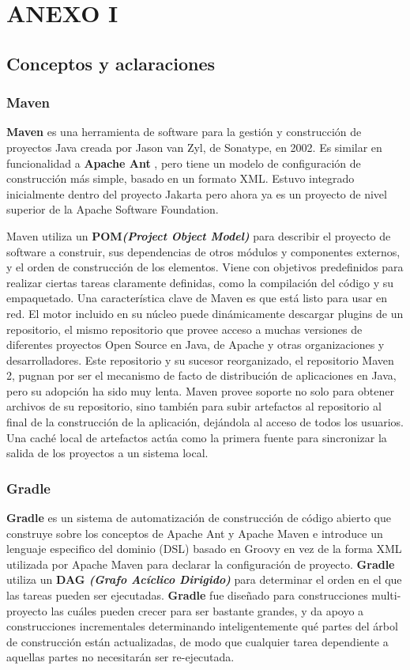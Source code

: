 \chapter{ANEXO I}
\section{Conceptos y aclaraciones}

\subsection{Maven}
\label{glo:maven}
\textbf{Maven} es una herramienta de software para la gestión y construcción de proyectos Java creada por Jason van Zyl, de Sonatype, en 2002. Es similar en funcionalidad a \textbf{Apache Ant }, pero tiene un modelo de configuración de construcción más simple, basado en un formato XML. Estuvo integrado inicialmente dentro del proyecto Jakarta pero ahora ya es un proyecto de nivel superior de la Apache Software Foundation.

Maven utiliza un \textbf{POM\textit{(Project Object Model)} }para describir el proyecto de software a construir, sus dependencias de otros módulos y componentes externos, y el orden de construcción de los elementos. Viene con objetivos predefinidos para realizar ciertas tareas claramente definidas, como la compilación del código y su empaquetado. Una característica clave de Maven es que está listo para usar en red. El motor incluido en su núcleo puede dinámicamente descargar plugins de un repositorio, el mismo repositorio que provee acceso a muchas versiones de diferentes proyectos Open Source en Java, de Apache y otras organizaciones y desarrolladores. Este repositorio y su sucesor reorganizado, el repositorio Maven 2, pugnan por ser el mecanismo de facto de distribución de aplicaciones en Java, pero su adopción ha sido muy lenta. Maven provee soporte no solo para obtener archivos de su repositorio, sino también para subir artefactos al repositorio al final de la construcción de la aplicación, dejándola al acceso de todos los usuarios. Una caché local de artefactos actúa como la primera fuente para sincronizar la salida de los proyectos a un sistema local. \cite{maven}

\subsection{Gradle}
\label{glo:gradle}
\textbf{Gradle} es un sistema de automatización de construcción de código abierto que construye sobre los conceptos de Apache Ant y Apache Maven e introduce un lenguaje especifico del dominio (DSL) basado en Groovy en vez de la forma XML utilizada por Apache Maven para declarar la configuración de proyecto. \textbf{Gradle} utiliza un \textbf{DAG \textit{(Grafo Acíclico Dirigido)}} para determinar el orden en el que las tareas pueden ser ejecutadas.
\textbf{Gradle} fue diseñado para construcciones multi-proyecto las cuáles pueden crecer para ser bastante grandes, y da apoyo a construcciones incrementales determinando inteligentemente qué partes del árbol de construcción están actualizadas, de modo que cualquier tarea dependiente a aquellas partes no necesitarán ser re-ejecutada.\cite{gradle}

